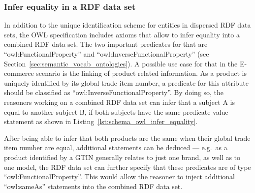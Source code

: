 \subsubsection{Infer equality in a \gls{RDF} data set}
\label{subsub:info_unique_infer}

In addition to the unique identification scheme for entities in dispersed \gls{RDF} data sets, the \gls{OWL} specification includes axioms that allow to infer equality into a combined \gls{RDF} data set. The two important predicates for that are ``owl:FunctionalProperty'' and ``owl:InverseFunctionalProperty'' (see Section~\ref{sec:semantic_vocab_ontologies}). A possible use case for that in the \gls{E-commerce} scenario is the linking of product related information. As a product is uniquely identified by its global trade item number, a predicate for this attribute should be classified as ``owl:InverseFunctionalProperty''. By doing so, the reasoners working on a combined \gls{RDF} data set can infer that a subject A is equal to another subject B, if both subjects have the same predicate-value statement as shown in Listing~\ref{lst:schema_owl_infer_equality}. \@


After being able to infer that both products are the same when their global trade item number are equal, additional statements can be deduced --- e.g.\ as a product identified by a \gls{GTIN} generally relates to just one brand, as well as to one model, the \gls{RDF} data set can further specify that these predicates are of type ``owl:FunctionalProperty''. This would allow the reasoner to inject additional ``owl:sameAs'' statements into the combined \gls{RDF} data set.



